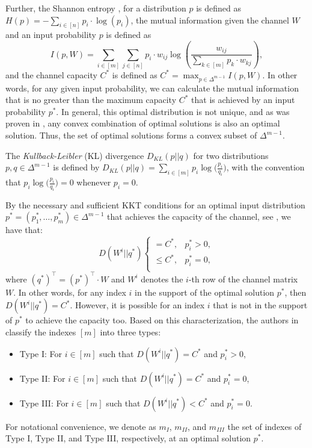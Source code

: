 \documentclass[11pt, letterpaper]{article}
\begin{document}
Further, the Shannon entropy \cite{Shannon48}, for a distribution $p$ is defined as $H(p) = - \sum_{i \in [n]} p_i \cdot \log(p_i)$, the mutual information given the channel $W$ and an input probability $p$ is defined as 
\begin{equation*}\label{eq:mutual information}
    I(p, W) = \sum_{i \in [m]} \sum_{j \in [n]} p_i \cdot w_{ij} \log\left(\frac{w_{ij}}{\sum_{k \in [m]} p_k \cdot w_{kj}}\right),
\end{equation*}
and the channel capacity $C^*$ is defined as $C^* = \max_{p \in \Delta^{m-1}} I(p, W)$. In other words, for any given input probability, we can calculate the mutual information that is no greater than the maximum capacity $C^*$ that is achieved by an input probability $p^*$. In general, this optimal distribution is not unique, and as was proven in \cite{Arimoto1972AnAF}, any convex combination of optimal solutions is also an optimal solution. Thus, the set of optimal solutions forms a convex subset of $\Delta^{m-1}$.

The \emph{Kullback-Leibler} (KL) divergence $D_{KL}(p || q)$ for two distributions $p, q \in \Delta^{m-1}$ is defined by $D_{KL}(p || q) = \sum_{i \in [m]} p_i \log\Big(\tfrac{p_i}{q_i}\Big)$, with the convention that $p_i \log\Big(\tfrac{p_i}{q_i}\Big) = 0$ whenever $p_i = 0$. 

\noindent By the necessary and sufficient KKT conditions for an optimal input distribution $p^* = (p^*_1, \ldots , p^*_m ) \in \Delta^{m-1}$ that achieves the capacity of the channel, see \cite{Jelinek1968ProbabilisticIT}, we have that:
\begin{equation*}
    D(W^i||q^*) \left\{ \begin{array}{ll}
        = C^*, & p^*_i>0, \\
        \leq C^*, & p^*_i=0,\\
    \end{array} \right.
\end{equation*}
where $(q^*)^{\top}= (p^*)^{\top}\cdot W$ and $W^i$ denotes the $i$-th row of the channel matrix $W$. In other words, for any index $i$ in the support of the optimal solution $p^*$, then $D(W^i||q^*) = C^*$. However, it is possible for an index $i$ that is not in the support of $p^*$ to achieve the capacity too. Based on this characterization, the authors in \cite{Nakagawa2020AnalysisOT} classify the indexes $[m]$ into three types:

\begin{itemize}
\item Type I: For $i\in [m]$ such that $D(W^i||q^*) = C^*$ and $p^*_i>0$,
\item Type II: For $i\in [m]$ such that $D(W^i||q^*) = C^*$ and $p^*_i = 0$,
\item Type III: For $i\in [m]$ such that $D(W^i||q^*) < C^*$ and $p^*_i = 0$.
\end{itemize}
For notational convenience, we denote as $m_I$, $m_{II}$, and $m_{III}$ the set of indexes of Type I, Type II, and Type III, respectively, at an optimal solution $p^*$. 
\end{document}
